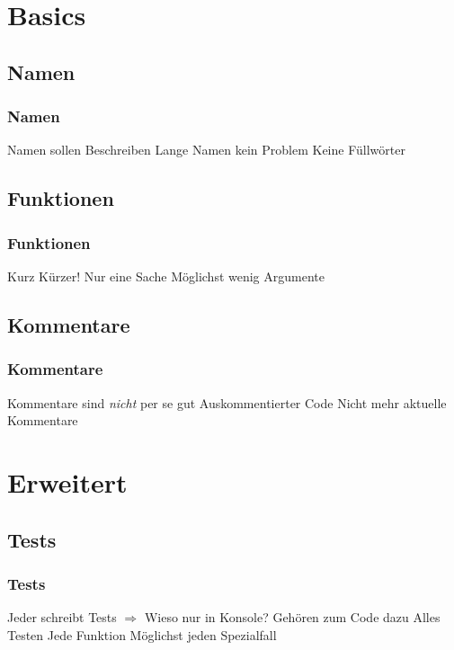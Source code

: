 \documentclass[handout]{beamer}
\begin{document}
\section{Basics}
\begin{frame}
    \tableofcontents[currentsection]
\end{frame}
\subsection{Namen}
\begin{frame}
    \frametitle{Namen}
    \begin{outline}
        \1 Namen sollen Beschreiben
        \1 Lange Namen kein Problem
        \1 Keine Füllwörter
    \end{outline}
\end{frame}

\subsection{Funktionen}
\begin{frame}
    \frametitle{Funktionen}
    \begin{outline}
        \1 Kurz
        \1 Kürzer!
        \1 Nur eine Sache
        \1 Möglichst wenig Argumente
    \end{outline}
\end{frame}

\subsection{Kommentare}
\begin{frame}
    \frametitle{Kommentare}
    \begin{outline}
        \1 Kommentare sind \emph{nicht} per se gut
        \1 Auskommentierter Code
        \1 Nicht mehr aktuelle Kommentare
    \end{outline}
\end{frame}

\section{Erweitert}
\subsection{Tests}
\begin{frame}
    \frametitle{Tests}
    \begin{outline}
        \1 Jeder schreibt Tests 
        \1[] $\Rightarrow$  Wieso nur in Konsole?
        \1 Gehören zum Code dazu
        \1 Alles Testen
            \2 Jede Funktion
            \2 Möglichst jeden Spezialfall
    \end{outline}
\end{frame}
\end{document}
